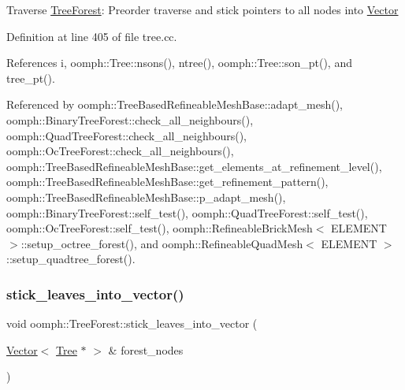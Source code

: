 Traverse \hyperlink{classoomph_1_1TreeForest}{Tree\+Forest}\+: Preorder traverse and stick pointers to all nodes into \hyperlink{classoomph_1_1Vector}{Vector} 

Definition at line 405 of file tree.\+cc.



References i, oomph\+::\+Tree\+::nsons(), ntree(), oomph\+::\+Tree\+::son\+\_\+pt(), and tree\+\_\+pt().



Referenced by oomph\+::\+Tree\+Based\+Refineable\+Mesh\+Base\+::adapt\+\_\+mesh(), oomph\+::\+Binary\+Tree\+Forest\+::check\+\_\+all\+\_\+neighbours(), oomph\+::\+Quad\+Tree\+Forest\+::check\+\_\+all\+\_\+neighbours(), oomph\+::\+Oc\+Tree\+Forest\+::check\+\_\+all\+\_\+neighbours(), oomph\+::\+Tree\+Based\+Refineable\+Mesh\+Base\+::get\+\_\+elements\+\_\+at\+\_\+refinement\+\_\+level(), oomph\+::\+Tree\+Based\+Refineable\+Mesh\+Base\+::get\+\_\+refinement\+\_\+pattern(), oomph\+::\+Tree\+Based\+Refineable\+Mesh\+Base\+::p\+\_\+adapt\+\_\+mesh(), oomph\+::\+Binary\+Tree\+Forest\+::self\+\_\+test(), oomph\+::\+Quad\+Tree\+Forest\+::self\+\_\+test(), oomph\+::\+Oc\+Tree\+Forest\+::self\+\_\+test(), oomph\+::\+Refineable\+Brick\+Mesh$<$ E\+L\+E\+M\+E\+N\+T $>$\+::setup\+\_\+octree\+\_\+forest(), and oomph\+::\+Refineable\+Quad\+Mesh$<$ E\+L\+E\+M\+E\+N\+T $>$\+::setup\+\_\+quadtree\+\_\+forest().

\mbox{\label{classoomph_1_1TreeForest_a6d99d1f513a60b9bd053ff98699cbe52}} 
\subsubsection{\texorpdfstring{stick\+\_\+leaves\+\_\+into\+\_\+vector()}{stick\_leaves\_into\_vector()}}
{\footnotesize\ttfamily void oomph\+::\+Tree\+Forest\+::stick\+\_\+leaves\+\_\+into\+\_\+vector (\begin{DoxyParamCaption}\item[{\hyperlink{classoomph_1_1Vector}{Vector}$<$ \hyperlink{classoomph_1_1Tree}{Tree} $\ast$ $>$ \&}]{forest\+\_\+nodes }\end{DoxyParamCaption})}



